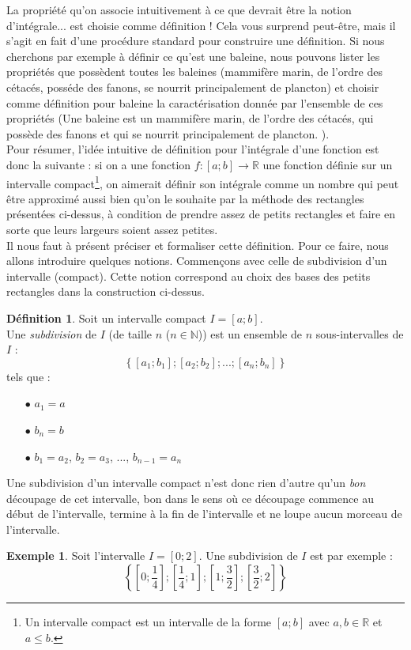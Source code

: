 \documentclass[a4paper,fontsize=13pt]{scrreprt}
\theoremstyle{plain}
\theoremstyle{definition}
\newtheorem{déf}[subsection]{Définition}
\newtheorem{exe}[subsection]{Exemple}
\newcommand{\nn}{\mathbb{N}}
\newcommand{\rr}{\mathbb{R}}
\begin{document}
La propriété qu'on associe intuitivement à ce que devrait être la notion d'intégrale... est choisie comme définition ! Cela vous surprend peut-être, mais il s'agit en fait d'une procédure standard pour construire une définition. Si nous cherchons par exemple à définir ce qu'est une baleine, nous pouvons lister les propriétés que possèdent toutes les baleines (mammifère marin, de l'ordre des cétacés, posséde des fanons, se nourrit principalement de plancton) et choisir comme définition pour baleine la caractérisation donnée par l'ensemble de ces propriétés (\og Une baleine est un mammifère marin, de l'ordre des cétacés, qui possède des fanons et qui se nourrit principalement de plancton. \fg{}). \\
Pour résumer, l'idée intuitive de définition pour l'intégrale d'une fonction est donc la suivante : si on a une fonction $f : [a;b] \to \rr$ une fonction définie sur un intervalle compact\footnote{Un intervalle compact est un intervalle de la forme $[a;b]$ avec $a,b \in \rr$ et $a \le b$.}, on aimerait définir son intégrale comme un nombre qui peut être approximé aussi bien qu'on le souhaite par la méthode des rectangles présentées ci-dessus, à condition de prendre assez de petits rectangles et faire en sorte que leurs largeurs soient assez petites. \\
Il nous faut à présent préciser et formaliser cette définition. Pour ce faire, nous allons introduire quelques notions. Commençons avec celle de subdivision d'un intervalle (compact). Cette notion correspond au choix des bases des petits rectangles dans la construction ci-dessus.
\begin{déf}
Soit un intervalle compact $I = [a;b]$. \\
Une \emph{subdivision} de $I$ (de taille $n$ ($n \in \nn$)) est un ensemble de $n$ sous-intervalles de $I$ :
$$\left\{[a_1;b_1];[a_2;b_2];...;[a_n;b_n]\right\}$$
tels que :
\begin{itemize}
\item [$\bullet$] $a_1 = a$
\item [$\bullet$] $b_n = b$
\item [$\bullet$] $b_1 = a_2$, $b_2=a_3$, ..., $b_{n-1} = a_n$
\end{itemize}
\end{déf}
Une subdivision d'un intervalle compact n'est donc rien d'autre qu'un \textit{bon} découpage de cet intervalle, bon dans le sens où ce découpage commence au début de l'intervalle, termine à la fin de l'intervalle et ne loupe aucun morceau de l'intervalle.
\begin{exe}
Soit l'intervalle $I = [0;2]$. Une subdivision de $I$ est par exemple :
$$\left\{[0;\frac{1}{4}];[\frac{1}{4};1];[1;\frac{3}{2}];[\frac{3}{2};2]\right\}$$
\end{exe}
\end{document}
